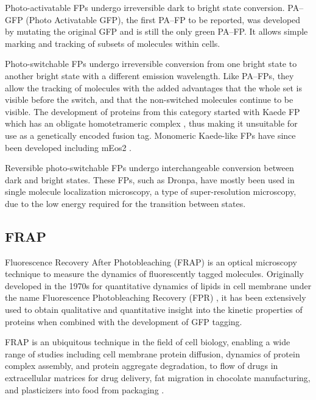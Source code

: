     Photo-activatable FPs undergo
        irreversible dark to bright state conversion.
        PA--GFP (Photo Activatable GFP), the first PA--FP to be
        reported, was developed by mutating the original GFP
        \citep{pagfp-discovery} and is
        still the only green PA--FP.
        It allows simple marking and tracking of subsets of molecules
        within cells.

    Photo-switchable FPs undergo
        irreversible conversion from one bright state to another bright
        state with a different emission wavelength.
        Like PA--FPs, they allow the tracking of
        molecules with the added advantages that the whole set is visible
        before the switch, and that the non-switched molecules continue
        to be visible.
        The development of proteins from this category started with Kaede FP
        which has an obligate homotetrameric
        complex \citep{kaede-discovery}, thus making it
        unsuitable for use as a genetically encoded fusion tag.
        Monomeric Kaede-like FPs have since been developed including
        mEos2 \citep{meos2-discovery}.

    Reversible photo-switchable FPs undergo
        interchangeable conversion between dark and bright states.
        These FPs, such as Dronpa, have mostly been used in
        single molecule localization
        microscopy, a type of super-resolution microscopy, due to the
        low energy required for the transition between states.

  \subsection{FRAP}

    Fluorescence Recovery After Photobleaching (FRAP) is an optical
    microscopy technique to measure the dynamics of fluorescently
    tagged molecules.
    Originally developed in the 1970s for quantitative dynamics of lipids
    in cell membrane under the name Fluorescence Photobleaching
    Recovery (FPR) \citep{axelrod1976mobility}, it has
    been extensively used to obtain qualitative and quantitative
    insight into the kinetic properties of proteins when combined with
    the development
    of GFP tagging.

    FRAP is an ubiquitous technique in the field of cell biology,
    enabling a wide range of studies
    including cell membrane protein diffusion, dynamics of
    protein complex assembly, and protein aggregate degradation, to
    flow of drugs in extracellular matrices for drug delivery, fat
    migration in chocolate manufacturing, and plasticizers into food
    from packaging
    \citep{frap-review-2005,mcnally-frap-2010,frap-review-2015}.

